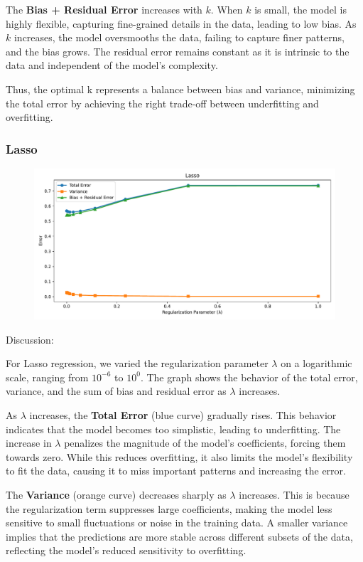 \documentclass[a4paper,10pt]{article}
\begin{document}
The \textbf{Bias + Residual Error} increases with \(k\). When \(k\) is small, the model is highly flexible, capturing fine-grained details in the data, leading to low bias. As \(k\) increases, the model oversmooths the data, failing to capture finer patterns, and the bias grows. The residual error remains constant as it is intrinsic to the data and independent of the model's complexity.

Thus, the optimal k represents a balance between bias and variance, minimizing the total error by achieving the right trade-off between underfitting and overfitting.


\subsubsection{Lasso}

\begin{figure}[H]
    \centering
    \includegraphics[width=0.8\linewidth]{images/2.3_lasso.pdf}
\end{figure}

Discussion:

For Lasso regression, we varied the regularization parameter \(\lambda\) on a logarithmic scale, ranging from \(10^{-6}\) to \(10^0\). The graph shows the behavior of the total error, variance, and the sum of bias and residual error as \(\lambda\) increases.

As \(\lambda\) increases, the \textbf{Total Error} (blue curve) gradually rises. This behavior indicates that the model becomes too simplistic, leading to underfitting. The increase in \(\lambda\) penalizes the magnitude of the model’s coefficients, forcing them towards zero. While this reduces overfitting, it also limits the model’s flexibility to fit the data, causing it to miss important patterns and increasing the error.

The \textbf{Variance} (orange curve) decreases sharply as \(\lambda\) increases. This is because the regularization term suppresses large coefficients, making the model less sensitive to small fluctuations or noise in the training data. A smaller variance implies that the predictions are more stable across different subsets of the data, reflecting the model's reduced sensitivity to overfitting.
\end{document}
